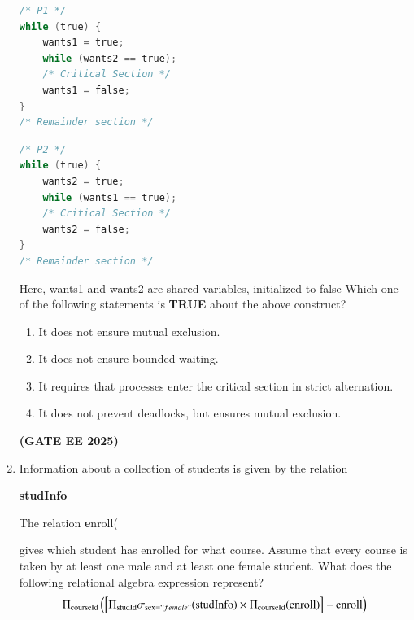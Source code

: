 \documentclass[journal,12pt,onecolumn]{IEEEtran}
\theoremstyle{remark}
\begin{document}
\begin{enumerate}
\begin{minipage}{0.45\linewidth}
\begin{lstlisting}[language=C]
/* P1 */
while (true) {
    wants1 = true;
    while (wants2 == true);
    /* Critical Section */
    wants1 = false;
}
/* Remainder section */
\end{lstlisting}
\end{minipage}
\hfill
\begin{minipage}{0.45\linewidth}
\begin{lstlisting}[language=C]
/* P2 */
while (true) {
    wants2 = true;
    while (wants1 == true);
    /* Critical Section */
    wants2 = false;
}
/* Remainder section */
\end{lstlisting}
\end{minipage}

\bigskip

Here, wants1 and wants2 are shared variables, initialized to false
Which one of the following statements is \textbf{TRUE }about the above construct?
\begin{enumerate}
\item It does not ensure mutual exclusion. 
\item It does not ensure bounded waiting. 
\item  It requires that processes enter the critical section in strict alternation. 
\item It does not prevent deadlocks, but ensures mutual exclusion.
\end{enumerate}
\hfill \textbf{(GATE EE 2025)}
 
\item  Information about a collection of students is given by the relation 

\textbf{studInfo}

The relation 
\textbf enroll(

gives which student has enrolled for  what course. Assume that every course is taken by at least one male and at least one female student. What does the following relational algebra expression represent?
\begin{align}
\Pi_{\text{courseId}} \left( \left[ \Pi_{\text{studId}} \sigma_{\text{sex} = ``female"} (\text{studInfo}) \times \Pi_{\text{courseId}} (\text{enroll}) \right] - \text{enroll} \right)
\end{align}


\end{enumerate}
\end{document}
